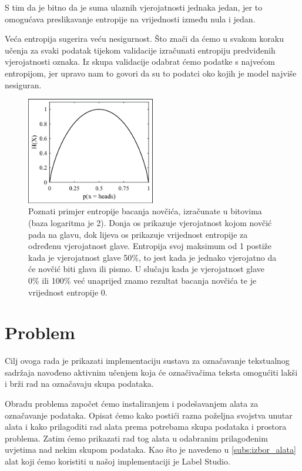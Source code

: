 \documentclass[times, utf8, zavrsni, numeric]{fer}
\begin{document}
S tim da je bitno da je suma ulaznih vjerojatnosti jednaka jedan, jer to omogućava preslikavanje entropije na vrijednosti između nula i jedan.

Veća entropija sugerira veću nesigurnost. Što znači da ćemo u svakom koraku učenja za svaki podatak tijekom validacije izračunati entropiju predviđenih vjerojatnosti oznaka. Iz skupa validacije odabrat ćemo podatke s najvećom entropijom, jer upravo nam to govori da su to podatci oko kojih je model najviše nesiguran.

\begin{figure}[H]
    \centering
    \includegraphics[width=0.5\textwidth]{pictures/entropija.png}
    \caption{Poznati primjer entropije bacanja novčića, izračunate u bitovima (baza logaritma je 2). Donja os prikazuje vjerojatnost kojom novčić pada na glavu, dok lijeva os prikazuje vrijednost entropije za određenu vjerojatnost glave. Entropija svoj maksimum od 1 postiže kada je vjerojatnost glave 50\%, to jest kada je jednako vjerojatno da će novčić biti glava ili pismo. U slučaju kada je vjerojatnost glave 0\% ili 100\% već unaprijed znamo rezultat bacanja novčića te je vrijednost entropije 0. \citep{entropy_picture}}
    \label{entropija}
\end{figure}

\chapter{Problem}

Cilj ovoga rada je prikazati implementaciju sustava za označavanje tekstualnog sadržaja navođeno aktivnim učenjem koja će označivačima teksta omogućiti lakši i brži rad na označavaju skupa podataka.

Obradu problema započet ćemo instaliranjem i podešavanjem alata za označavanje podataka. Opisat ćemo kako postići razna poželjna svojstva unutar alata i kako prilagoditi rad alata prema potrebama skupa podataka i prostora problema. Zatim ćemo prikazati rad tog alata u odabranim prilagođenim uvjetima nad nekim skupom podataka. Kao što je navedeno u \autoref{subs:izbor_alata} alat koji ćemo koristiti u našoj implementaciji je Label Studio.
\end{document}
